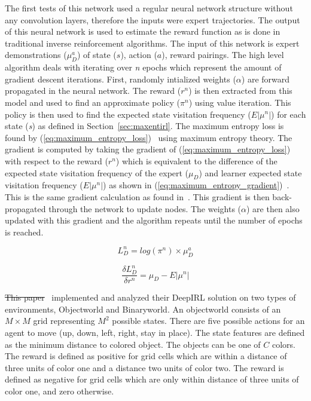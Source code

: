 \documentclass[12pt,american]{report}
\providecommand{\DIFaddtex}[1]{{\protect\color{blue}\uwave{#1}}} %
\providecommand{\DIFdeltex}[1]{{\protect\color{red}\sout{#1}}}                      %
\providecommand{\DIFaddbegin}{} %
\providecommand{\DIFaddend}{} %
\providecommand{\DIFdelbegin}{} %
\providecommand{\DIFdelend}{} %
\providecommand{\DIFadd}[1]{\texorpdfstring{\DIFaddtex{#1}}{#1}} %
\providecommand{\DIFdel}[1]{\texorpdfstring{\DIFdeltex{#1}}{}} %
\newcommand{\DIFscaledelfig}{0.5}
\newlength{\DIFdelgraphicswidth} %
\newlength{\DIFdelgraphicsheight} %
\newcommand{\DIFaddincludegraphics}[2][]{{\color{blue}\fbox{\DIFOincludegraphics[#1]{#2}}}} %
\newcommand{\DIFdelincludegraphics}[2][]{%
\sbox{\DIFdelgraphicsbox}{\DIFOincludegraphics[#1]{#2}}%
\settoboxwidth{\DIFdelgraphicswidth}{\DIFdelgraphicsbox} %
\settoboxtotalheight{\DIFdelgraphicsheight}{\DIFdelgraphicsbox} %
\scalebox{\DIFscaledelfig}{%
\parbox[b]{\DIFdelgraphicswidth}{\usebox{\DIFdelgraphicsbox}\\[-\baselineskip] \rule{\DIFdelgraphicswidth}{0em}}\llap{\resizebox{\DIFdelgraphicswidth}{\DIFdelgraphicsheight}{%
\setlength{\unitlength}{\DIFdelgraphicswidth}%
\begin{picture}(1,1)%
\thicklines\linethickness{2pt} %
{\color[rgb]{1,0,0}\put(0,0){\framebox(1,1){}}}%
{\color[rgb]{1,0,0}\put(0,0){\line( 1,1){1}}}%
{\color[rgb]{1,0,0}\put(0,1){\line(1,-1){1}}}%
\end{picture}%
}\hspace*{3pt}}} %
} %
\DeclareRobustCommand{\DIFaddbegin}{\DIFOaddbegin \let\includegraphics\DIFaddincludegraphics} %
\DeclareRobustCommand{\DIFaddend}{\DIFOaddend \let\includegraphics\DIFOincludegraphics} %
\DeclareRobustCommand{\DIFdelbegin}{\DIFOdelbegin \let\includegraphics\DIFdelincludegraphics} %
\DeclareRobustCommand{\DIFdelend}{\DIFOaddend \let\includegraphics\DIFOincludegraphics} %
\begin{document}
The first tests of this network used a regular neural network structure without any convolution layers, therefore the inputs were expert trajectories. The output of this neural network is used to estimate the reward function as is done in traditional inverse reinforcement algorithms. The input of this network is expert demonstrations ($\mu_{D}^{a}$) of state ($s$), action ($a$), reward pairings. The high level algorithm deals with iterating over \textit{n} epochs which represent the amount of gradient descent iterations. First, randomly intialized weights ($\alpha$) are forward propagated in the neural network.  The reward ($r^n$) is then extracted from this model and used to find an approximate policy ($\pi^n$) using value iteration. This policy is then used to find the expected state visitation frequency ($E|\mu^n|$) for each state (\textit{s}) as defined in Section~\ref{sec:maxentirl}.  The maximum entropy loss is found by (\ref{eq:maximum_entropy_loss})~\cite{wulfmeier2015maximum} using maximum entropy theory. The gradient is computed by taking the gradient of (\ref{eq:maximum_entropy_loss}) with respect to the reward ($r^n$) which is equivalent to the difference of the expected state visitation frequency of the expert ($\mu_D$) and learner expected state visitation frequency ($E|\mu^n|$) as shown in (\ref{eq:maximum_entropy_gradient})~\cite{wulfmeier2015maximum}.  This is the same gradient calculation as found in~\cite{ziebart2008maximum}.  This gradient is then back-propagated through the network to update nodes.  The weights ($\alpha$) are then also updated with this gradient and the algorithm repeats until the number of epochs is reached. 

\begin{equation}
            \label{eq:maximum_entropy_loss}
            L_{D}^{n}=log(\pi^n) \times \mu_{D}^{a}%
        \end{equation}

\begin{equation}
            \label{eq:maximum_entropy_gradient}
           \frac{\delta L_{D}^{n}}{\delta r^{n}}=\mu_D -  E|\mu^n|%
        \end{equation}

\DIFdelbegin \DIFdel{This paper}\DIFdelend \DIFaddbegin \DIFadd{Wulfmeier et al.}\DIFaddend ~\cite{wulfmeier2015maximum} implemented and analyzed their DeepIRL solution on two types of environments, Objectworld and Binaryworld. An objectworld consists of an $M\times M$ grid representing $M^2$ possible states.  There are five possible actions for an agent to move (up, down, left, right, stay in place). The state features are defined as the minimum distance to colored object.  The objects can be one of $C$ colors. The reward is defined as positive for grid cells which are within a distance of three units of color one and a distance two units of color two. The reward is defined as negative for grid cells which are only within distance of three units of color one, and zero otherwise.  
\end{document}
